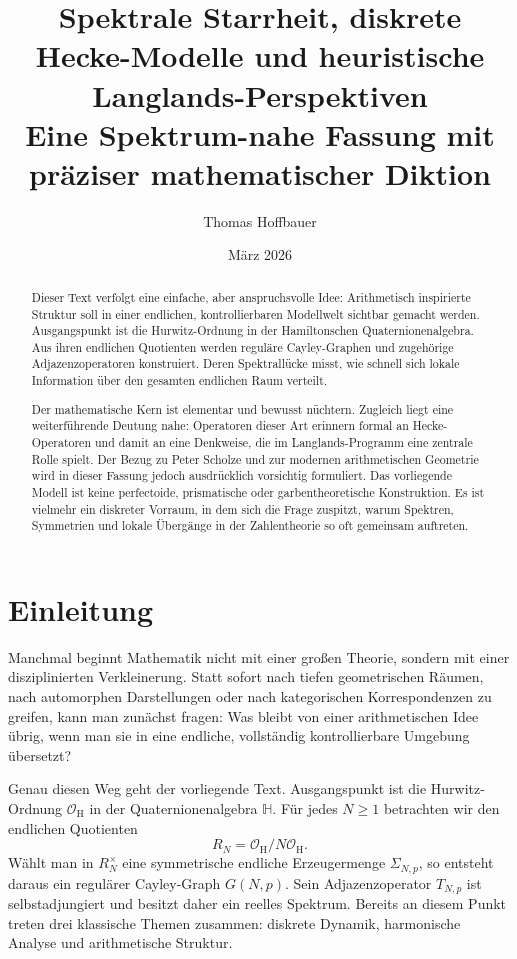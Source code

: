 \documentclass[12pt,a4paper]{article}
\title{\textbf{Spektrale Starrheit, diskrete Hecke-Modelle und heuristische Langlands-Perspektiven}\\
\large Eine Spektrum-nahe Fassung mit präziser mathematischer Diktion}
\author{Thomas Hoffbauer}
\date{März 2026}
\theoremstyle{plain}
\theoremstyle{definition}
\theoremstyle{remark}
\newcommand{\HH}{\mathbb{H}}
\newcommand{\OH}{\mathcal{O}_{\mathrm H}}
\newcommand{\RN}{R_N}
\newcommand{\SNp}{\Sigma_{N,p}}
\newcommand{\GNp}{G(N,p)}
\newcommand{\TNp}{T_{N,p}}
\begin{document}
\maketitle

\begin{abstract}
Dieser Text verfolgt eine einfache, aber anspruchsvolle Idee: Arithmetisch inspirierte Struktur soll in einer endlichen, kontrollierbaren Modellwelt sichtbar gemacht werden. Ausgangspunkt ist die Hurwitz-Ordnung in der Hamiltonschen Quaternionenalgebra. Aus ihren endlichen Quotienten werden reguläre Cayley-Graphen und zugehörige Adjazenzoperatoren konstruiert. Deren Spektrallücke misst, wie schnell sich lokale Information über den gesamten endlichen Raum verteilt.

Der mathematische Kern ist elementar und bewusst nüchtern. Zugleich liegt eine weiterführende Deutung nahe: Operatoren dieser Art erinnern formal an Hecke-Operatoren und damit an eine Denkweise, die im Langlands-Programm eine zentrale Rolle spielt. Der Bezug zu Peter Scholze und zur modernen arithmetischen Geometrie wird in dieser Fassung jedoch ausdrücklich vorsichtig formuliert. Das vorliegende Modell ist keine perfectoide, prismatische oder garbentheoretische Konstruktion. Es ist vielmehr ein diskreter Vorraum, in dem sich die Frage zuspitzt, warum Spektren, Symmetrien und lokale Übergänge in der Zahlentheorie so oft gemeinsam auftreten.
\end{abstract}

\section{Einleitung}
Manchmal beginnt Mathematik nicht mit einer großen Theorie, sondern mit einer disziplinierten Verkleinerung. Statt sofort nach tiefen geometrischen Räumen, nach automorphen Darstellungen oder nach kategorischen Korrespondenzen zu greifen, kann man zunächst fragen: Was bleibt von einer arithmetischen Idee übrig, wenn man sie in eine endliche, vollständig kontrollierbare Umgebung übersetzt?

Genau diesen Weg geht der vorliegende Text. Ausgangspunkt ist die Hurwitz-Ordnung \(\OH\) in der Quaternionenalgebra \(\HH\). Für jedes \(N\geq 1\) betrachten wir den endlichen Quotienten
\[
\RN = \OH/N\OH.
\]
Wählt man in \(\RN^\times\) eine symmetrische endliche Erzeugermenge \(\SNp\), so entsteht daraus ein regulärer Cayley-Graph \(\GNp\). Sein Adjazenzoperator \(\TNp\) ist selbstadjungiert und besitzt daher ein reelles Spektrum. Bereits an diesem Punkt treten drei klassische Themen zusammen: diskrete Dynamik, harmonische Analyse und arithmetische Struktur.
\end{document}
